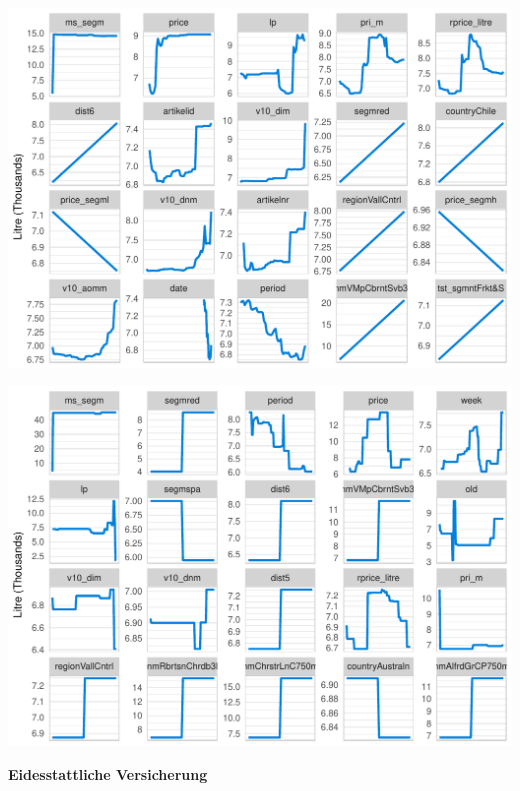 \documentclass[11pt,]{article}
\let\origfigure\figure
\let\endorigfigure\endfigure
\renewenvironment{figure}[1][2] {
    \expandafter\origfigure\expandafter[H]
} {
    \endorigfigure
}
\begin{document}
\begin{figure}
\centering
\includegraphics{../00_data/output_paper/11_par_dep_random_forest_other.pdf}
\caption{\label{fig:rfpardep_other}Random Forest: Partial Dependence
Plots.}
\end{figure}

\begin{figure}
\centering
\includegraphics{../00_data/output_paper/16_pdp_boosting_main.pdf}
\caption{\label{fig:bgpardep_main}Boosting: Partial Dependence Plots.}
\end{figure}

\restoregeometry

\cleardoublepage

\newpage
\textbf{Eidesstattliche Versicherung}

\bigskip
\end{document}
